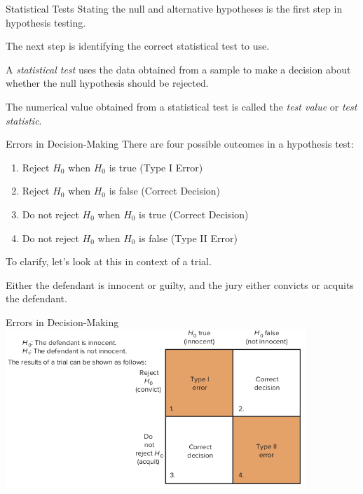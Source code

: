 \documentclass[t, aspectratio=169]{beamer}
\newcommand{\?}{\stackrel{?}{=}}
\begin{document}
	\begin{frame}{Statistical Tests}
		Stating the null and alternative hypotheses is the first step in hypothesis testing. \pause
		
		The next step is identifying the correct statistical test to use. \pause
		
		A \textit{statistical test} uses the data obtained from a sample to make a decision about whether the null hypothesis should be rejected. \pause
		
		The numerical value obtained from a statistical test is called the \textit{test value} or \textit{test statistic}.
	\end{frame}

	\begin{frame}{Errors in Decision-Making}
		There are four possible outcomes in a hypothesis test: \pause \begin{enumerate}[1)]
			\item Reject $H_0$ when $H_0$ is true (Type I Error) \pause
			\item Reject $H_0$ when $H_0$ is false (Correct Decision) \pause
			\item Do not reject $H_0$ when $H_0$ is true (Correct Decision) \pause
			\item Do not reject $H_0$ when $H_0$ is false (Type II Error) \pause
		\end{enumerate}
	
		To clarify, let's look at this in context of a trial. \pause
		
		Either the defendant is innocent or guilty, and the jury either convicts or acquits the defendant.
	\end{frame}

	\begin{frame}{Errors in Decision-Making}
		\includegraphics[width=0.85\textwidth]{error-example.png}
	\end{frame}
\end{document}
